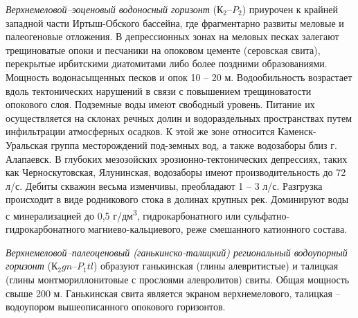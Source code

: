 \documentclass[a4paper,12pt]{article} %
\begin{document}
\textit{Верхнемеловой–эоценовый водоносный горизонт} ($К_2–P_2$) приурочен к крайней западной 
части Иртыш-Обского бассейна, где фрагментарно развиты меловые и палеогеновые отложения. 
В депрессионных зонах на меловых песках залегают трещиноватые опоки и песчаники на опоковом цементе 
(серовская свита), перекрытые ирбитскими диатомитами либо более поздними образованиями. 
Мощность водонасыщенных песков и опок 10 – 20 м.
Водообильность возрастает вдоль тектонических нарушений в связи с повышением трещиноватости опокового слоя. Подземные воды имеют свободный уровень. Питание их осуществляется на склонах речных долин и водораздельных пространствах путем инфильтрации атмосферных осадков.
К этой же зоне относится Каменск-Уральская группа месторождений под-земных вод, 
а также водозаборы близ г. Алапаевск. В глубоких мезозойских эрозионно-тектонических депрессиях, таких как Черноскутовская, Ялунинская, водозаборы имеют производительность до 72 л/с. Дебиты скважин весьма изменчивы, преобладают 1 – 3 л/с. Разгрузка происходит в виде родникового стока в долинах крупных рек. Доминируют воды с минерализацией до 0,5 г/дм\textsuperscript{3}, гидрокарбонатного или сульфатно-гидрокарбонатного магниево-кальциевого, реже смешанного катионного состава.

\textit{Верхнемеловой–палеоценовый (ганькинско-талицкий) региональный водоупорный горизонт} ($К_2gn–P_1tl$) образуют ганькинская (глины алевритистые) и талицкая (глины монтмориллонитовые с прослоями алевролитов) свиты. Общая мощность свыше 200 м. Ганькинская свита является экраном верхнемелового, талицкая – водоупором вышеописанного опокового горизонтов.
\end{document}
